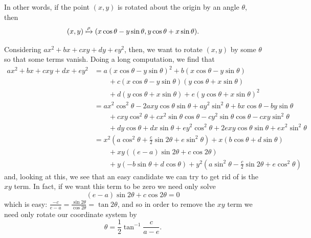 \documentclass[a4paper,leqno]{article}
\numberwithin{equation}{section}
\theoremstyle{definition}
\theoremstyle{remark}
\begin{document}
In other words, if the point $ (x,y) $ is rotated about the origin by an angle $ \theta $, then
\begin{equation}
  (x,y) \xmapsto{\rho} (x \cos \theta - y \sin \theta,y \cos \theta + x \sin \theta).
\end{equation}

Considering $ ax^2 + bx + cxy + dy + ey^2 $, then, we want to rotate $ (x,y) $ by some $ \theta $ so that some terms vanish. Doing
a long computation, we find that
\begin{align*}
  ax^2 + bx + cxy + dx + ey^2 &= a(x \cos \theta - y \sin \theta)^2 + b(x \cos \theta - y \sin \theta)\\
                              &  \qquad + c(x \cos \theta - y \sin \theta)(y \cos \theta + x \sin \theta)\\
                              &  \qquad + d(y \cos \theta + x \sin \theta) + e(y \cos \theta + x \sin \theta)^2\\
                              &= ax^2 \cos^2 \theta - 2axy \cos\theta\sin\theta + ay^2 \sin^2\theta + bx\cos\theta - by\sin\theta\\
                              &  \qquad + cxy \cos^2 \theta + cx^2 \sin \theta\cos\theta - cy^2 \sin\theta\cos\theta - cxy \sin^2\theta\\
                              &  \qquad + dy\cos\theta + dx\sin\theta + ey^2\cos^2\theta + 2exy\cos\theta\sin\theta + ex^2\sin^2\theta\\
                              &= x^2(a\cos^2 \theta + \frac{c}{2}\sin 2\theta + e\sin^2 \theta) + x(b \cos \theta + d\sin \theta)\\
                              &  \qquad + xy ((e - a)\sin 2\theta + c \cos 2\theta)\\
                              &  \qquad + y(-b \sin \theta + d \cos \theta) + y^2(a\sin^2 \theta - \frac{c}{2}\sin 2\theta + e\cos^2 \theta)
\end{align*}
and, looking at this, we see that an easy candidate we can try to get rid of is the $ xy $ term. In fact, if we want this term
to be zero we need only solve
\begin{equation}
  (e - a)\sin 2\theta + c \cos 2\theta = 0
\end{equation}
which is easy: $ \frac{-c}{e - a} = \frac{\sin 2\theta}{\cos 2\theta} = \tan 2\theta $, and so in order to remove
the $ xy $ term we need only rotate our coordinate system by
\begin{equation}
  \theta = \frac{1}{2}\tan^{-1} \frac{c}{a - e}.
\end{equation}
\end{document}

